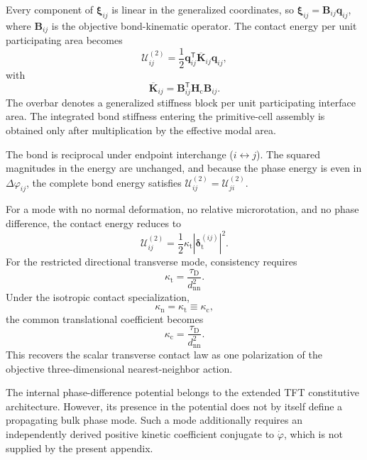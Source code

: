 Every component of $\boldsymbol{\xi}_{ij}$ is linear in the generalized coordinates, so $\boldsymbol{\xi}_{ij} = \mathbf{B}_{ij}\mathbf{q}_{ij}$, where $\mathbf{B}_{ij}$ is the objective bond-kinematic operator. The contact energy per unit participating area becomes
\begin{equation}
    \mathcal{U}_{ij}^{(2)} = \frac{1}{2} \mathbf{q}_{ij}^{\mathsf{T}} \overline{\mathbf{K}}_{ij} \mathbf{q}_{ij},
\end{equation}
with
\begin{equation}
    \overline{\mathbf{K}}_{ij} = \mathbf{B}_{ij}^{\mathsf{T}} \mathbf{H}_{\mathrm{c}} \mathbf{B}_{ij}.
\end{equation}
The overbar denotes a generalized stiffness block per unit participating interface area. The integrated bond stiffness entering the primitive-cell assembly is obtained only after multiplication by the effective modal area.

The bond is reciprocal under endpoint interchange ($i \leftrightarrow j$). The squared magnitudes in the energy are unchanged, and because the phase energy is even in $\Delta\varphi_{ij}$, the complete bond energy satisfies $\mathcal{U}_{ij}^{(2)} = \mathcal{U}_{ji}^{(2)}$.

For a mode with no normal deformation, no relative microrotation, and no phase difference, the contact energy reduces to
\begin{equation}
    \mathcal{U}_{ij}^{(2)} = \frac{1}{2} \kappa_{\mathrm{t}} |\boldsymbol{\delta}_{\mathrm{t}}^{(ij)}|^2.
\end{equation}
For the restricted directional transverse mode, consistency requires
\begin{equation}
    \kappa_{\mathrm{t}} = \frac{\tau_{\mathrm{D}}}{d_{\mathrm{nn}}^2}.
\end{equation}
Under the isotropic contact specialization,
\begin{equation}
    \kappa_{\mathrm{n}}=\kappa_{\mathrm{t}}\equiv\kappa_{\mathrm{c}},
\end{equation}
the common translational coefficient becomes
\begin{equation}
    \kappa_{\mathrm{c}} = \frac{\tau_{\mathrm{D}}}{d_{\mathrm{nn}}^2}.
\end{equation}
This recovers the scalar transverse contact law as one polarization of the objective three-dimensional nearest-neighbor action.

The internal phase-difference potential belongs to the extended TFT constitutive architecture. However, its presence in the potential does not by itself define a propagating bulk phase mode. Such a mode additionally requires an independently derived positive kinetic coefficient conjugate to $\dot{\varphi}$, which is not supplied by the present appendix.

